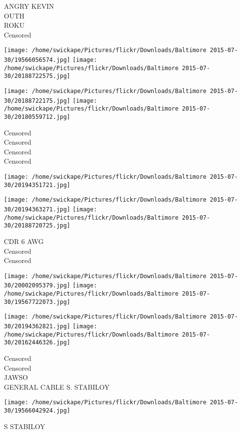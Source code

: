 \documentclass[10pt,letterpaper]{article}
\begin{document}
ANGRY KEVIN\\
OUTH\\
ROKU\\
Censored\\
\pagebreak

\texttt{[image: /home/swickape/Pictures/flickr/Downloads/Baltimore 2015-07-30/19566056574.jpg]}
\texttt{[image: /home/swickape/Pictures/flickr/Downloads/Baltimore 2015-07-30/20188722575.jpg]}

\texttt{[image: /home/swickape/Pictures/flickr/Downloads/Baltimore 2015-07-30/20188722175.jpg]}
\texttt{[image: /home/swickape/Pictures/flickr/Downloads/Baltimore 2015-07-30/20180559712.jpg]}

Censored\\
Censored\\
Censored\\
Censored\\
\pagebreak

\texttt{[image: /home/swickape/Pictures/flickr/Downloads/Baltimore 2015-07-30/20194351721.jpg]}

\vspace{0.25in}
\texttt{[image: /home/swickape/Pictures/flickr/Downloads/Baltimore 2015-07-30/20194363271.jpg]}
\texttt{[image: /home/swickape/Pictures/flickr/Downloads/Baltimore 2015-07-30/20188720725.jpg]}

CDR 6 AWG\\
Censored\\
Censored\\
\pagebreak

\texttt{[image: /home/swickape/Pictures/flickr/Downloads/Baltimore 2015-07-30/20002095379.jpg]}
\texttt{[image: /home/swickape/Pictures/flickr/Downloads/Baltimore 2015-07-30/19567722073.jpg]}

\texttt{[image: /home/swickape/Pictures/flickr/Downloads/Baltimore 2015-07-30/20194362821.jpg]}
\texttt{[image: /home/swickape/Pictures/flickr/Downloads/Baltimore 2015-07-30/20162446326.jpg]}

Censored\\
Censored\\
JAWSO\\
GENERAL CABLE S. STABILOY\\
\pagebreak

\texttt{[image: /home/swickape/Pictures/flickr/Downloads/Baltimore 2015-07-30/19566042924.jpg]}

S STABILOY\\
\pagebreak
\end{document}
